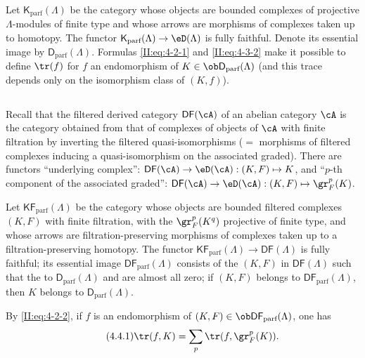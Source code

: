 Let $\mathsf{K}_\text{parf}(\Lambda)$ be the category whose objects are
bounded complexes of projective $\Lambda$-modules of finite type and whose
arrows are morphisms of complexes taken up to homotopy. The functor
$\mathsf{K}_\text{parf}(\Lambda)\to\eD(\Lambda)$ is fully faithful. Denote its
essential image by $\mathsf{D}_\text{parf}(\Lambda)$. Formulas
\eqref{II:eq:4-2-1} and \eqref{II:eq:4-3-2} make it possible to define
$\tr(f)$ for $f$ an endomorphism of
$K\in\ob \mathsf{D}_\text{parf}(\Lambda)$ (and this trace depends only on the
isomorphism class of $(K,f)$).






\subsection{}\label{II:4-4}

Recall that the filtered derived category $\mathsf{DF}(\cA)$ of an abelian
category $\cA$ is the category obtained from that of complexes of objects of
$\cA$ with finite filtration by inverting the filtered quasi-isomorphisms
($=$ morphisms of filtered complexes inducing a quasi-isomorphism on the
associated graded). There are functors ``underlying complex'':
$\mathsf{DF}(\cA)\to\eD(\cA): (K,F)\mapsto K$, and ``$p$-th component of the
associated graded'':
$\mathsf{DF}(\cA)\to\eD(\cA): (K,F)\mapsto \gr_F^p(K)$.

Let $\mathsf{KF}_\text{parf}(\Lambda)$ be the category whose objects are
bounded filtered complexes $(K,F)$ with finite filtration, with the
$\gr_F^p(K^q)$ projective of finite type, and whose arrows are
filtration-preserving morphisms of complexes taken up to a
filtration-preserving homotopy. The functor
$\mathsf{KF}_\text{parf}(\Lambda)\to\mathsf{DF}(\Lambda)$ is fully faithful;
its essential image $\mathsf{DF}_\text{parf}(\Lambda)$ consists of the $(K,F)$ in
$\mathsf{DF}(\Lambda)$ such that the  to
$\mathsf{D}_\text{parf}(\Lambda)$ and are almost all zero; if $(K,F)$ belongs to
$\mathsf{DF}_\text{parf}(\Lambda)$, then $K$ belongs to
$\mathsf{D}_\text{parf}(\Lambda)$.

By \eqref{II:eq:4-2-2}, if $f$ is an endomorphism of
$(K,F)\in\ob\mathsf{DF}_\text{parf}(\Lambda)$, one has
\begin{equation*}\tag{4.4.1}\label{II:eq:4-4-1}
 \tr(f,K) = \sum_p \tr(f,\gr_F^p(K)) \text{.}
\end{equation*}






